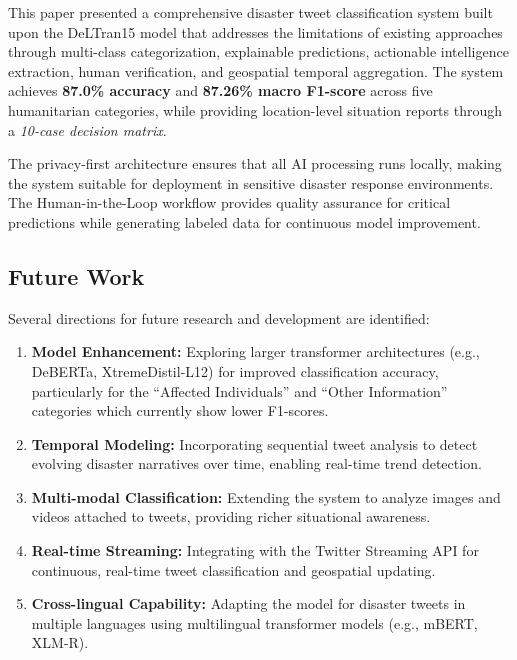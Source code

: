 \documentclass[pdflatex,sn-mathphys-num]{sn-jnl}%
\theoremstyle{thmstyleone}%
\theoremstyle{thmstyletwo}%
\theoremstyle{thmstylethree}%
\begin{document}
This paper presented a comprehensive disaster tweet classification system built upon the DeLTran15 model \cite{ref16} that addresses the limitations of existing approaches through multi-class categorization, explainable predictions, actionable intelligence extraction, human verification, and geospatial temporal aggregation. The system achieves \textbf{87.0\% accuracy} and \textbf{87.26\% macro F1-score} across five humanitarian categories, while providing location-level situation reports through a \textit{10-case decision matrix}.

The privacy-first architecture ensures that all AI processing runs locally, making the system suitable for deployment in sensitive disaster response environments. The Human-in-the-Loop workflow provides quality assurance for critical predictions while generating labeled data for continuous model improvement.

\subsection{Future Work}

Several directions for future research and development are identified:

\begin{enumerate}
    \item \textbf{Model Enhancement:} Exploring larger transformer architectures (e.g., DeBERTa, XtremeDistil-L12) for improved classification accuracy, particularly for the ``Affected Individuals'' and ``Other Information'' categories which currently show lower F1-scores.

    \item \textbf{Temporal Modeling:} Incorporating sequential tweet analysis to detect evolving disaster narratives over time, enabling real-time trend detection.

    \item \textbf{Multi-modal Classification:} Extending the system to analyze images and videos attached to tweets, providing richer situational awareness.

    \item \textbf{Real-time Streaming:} Integrating with the Twitter Streaming API for continuous, real-time tweet classification and geospatial updating.

    \item \textbf{Cross-lingual Capability:} Adapting the model for disaster tweets in multiple languages using multilingual transformer models (e.g., mBERT, XLM-R).
\end{enumerate}
\end{document}
